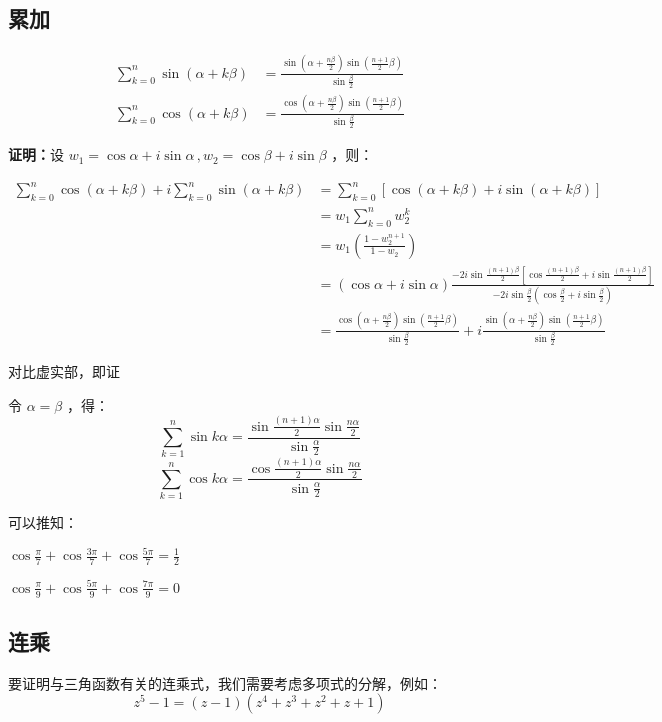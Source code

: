 \subsection{累加}
\begin{theorem}{}

\begin{equation}%
\begin{aligned}
\sum_{k=0}^n\sin(\alpha+k\beta)&=\frac{\sin\left(\alpha+\frac{n\beta}2\right)\sin\left(\frac{n+1}2\beta\right)}{\sin\frac{\beta}2}\\\sum_{k=0}^n\cos(\alpha+k\beta)&=\frac{\cos\left(\alpha+\frac{n\beta}2\right)\sin\left(\frac{n+1}2\beta\right)}{\sin\frac{\beta}2}
\end{aligned}
\end{equation}

\textbf{证明：}设 $w_1=\cos \alpha+i\sin\alpha\,,w_2=\cos \beta+i\sin\beta$ ，则：

$$\begin{aligned}
\sum_{k=0}^n\cos(\alpha+k\beta)+i\sum_{k=0}^n\sin(\alpha+k\beta)&=\sum_{k=0}^n\left[\cos(\alpha+k\beta)+i\sin(\alpha+k\beta)\right]\\&=w_1\sum_{k=0}^nw_2^k \\&=w_1\left(\frac{1-w_2^{n+1}}{1-w_2}\right)\\ &=(\cos \alpha+i\sin\alpha)\frac{-2i\sin{\frac{(n+1)\beta}2}\left[\cos{\frac{(n+1)\beta}2}+i\sin{\frac{(n+1)\beta}2}\right]}{-2i\sin{\frac{\beta}2}\left(\cos{\frac{\beta}2}+i\sin{\frac{\beta}2}\right)}\\ &=\frac{\cos\left(\alpha+\frac{n\beta}2\right)\sin\left(\frac{n+1}2\beta\right)}{\sin\frac{\beta}2}+i\frac{\sin\left(\alpha+\frac{n\beta}2\right)\sin\left(\frac{n+1}2\beta\right)}{\sin\frac{\beta}2}
\end{aligned}$$

对比虚实部，即证
\end{theorem}

令 $\alpha=\beta$ ，得：
$$\sum_{k=1}^n\sin k\alpha=\frac{\sin{\frac{(n+1)\alpha}2}\sin{\frac{n\alpha}{2}}}{\sin{\frac{\alpha}2}}$$ $$\sum_{k=1}^n\cos k\alpha=\frac{\cos{\frac{(n+1)\alpha}2}\sin{\frac{n\alpha}{2}}}{\sin{\frac{\alpha}2}}$$ 

可以推知：

$\displaystyle{\cos\frac{\pi}{7}+\cos\frac{3\pi}{7}+\cos\frac{5\pi}{7}=\frac{1}{2}}$

$\displaystyle{\cos\frac{\pi}{9}+\cos\frac{5\pi}{9}+\cos\frac{7\pi}{9}=0}$

\subsection{连乘}
要证明与三角函数有关的连乘式，我们需要考虑多项式的分解，例如：
$$z^5-1=(z-1)(z^4+z^3+z^2+z+1)$$

